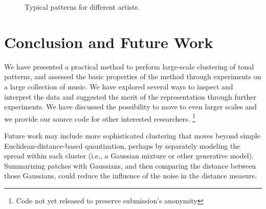 \documentclass{article}
\begin{document}
\begin{figure}[h]
  \centering
  \hspace{5mm}                
  \vspace{2mm}
  \caption{\small{Typical patterns for different artists.}}
  \label{fig:typicalpat}
\end{figure}



\section{Conclusion and Future Work}
We have presented a practical method to perform large-scale clustering of
tonal patterns, and assessed the basic properties of the method through
experiments on a large collection of music. We have explored several ways
to inspect and interpret the data 
and suggested the merit of the representation
through further experiments.
We have discussed the possibility to move to even larger scales
and we provide our source code for other interested researchers.
\footnote{Code not yet released to preserve submission's anonymity}

Future work may include more sophisticated clustering that moves 
beyond simple Euclidean-distance-based quantization, perhaps 
by separately modeling the spread within each cluster (i.e., a Gaussian 
mixture or other generative model). 
Summarizing patches
with Gaussians, and then comparing the distance between those Gaussians,
could reduce the influence of the noise in the distance measure.
\end{document}
